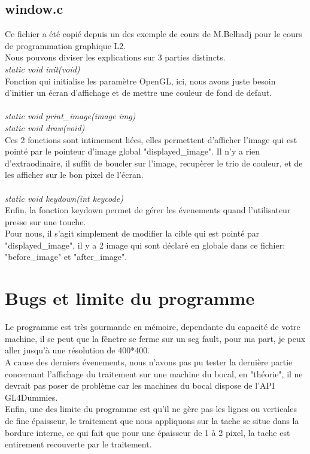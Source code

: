 \documentclass[12pt, letterpaper]{article}
\begin{document}
\subsection{window.c}
Ce fichier a été copié depuis un des exemple de cours de M.Belhadj pour le cours de programmation graphique L2.\\
Nous pouvons diviser les explications sur 3 parties distincts. \\
\textit{static void init(void)}\\
Fonction qui initialise les paramètre OpenGL, ici, nous avons juste besoin d'initier un écran d'affichage 
et de mettre une couleur de fond de defaut.\\\\
\textit{static void print\_image(image img)}\\
\textit{static void draw(void)}\\
Ces 2 fonctions sont intimement liées, elles permettent d'afficher l'image qui est pointé par le pointeur d'image global 
"displayed\_image". Il n'y a rien d'extraodinaire, il suffit de boucler sur l'image, recupèrer le trio de couleur, et de les afficher sur le bon pixel de l'écran.\\ 
\\
\textit{static void keydown(int keycode)}\\
Enfin, la fonction keydown permet de gérer les évenements quand l'utilisateur presse sur une touche.\\
Pour nous, il s'agit simplement de modifier la cible qui est pointé par "displayed\_image", il y a 2 image qui sont déclaré en globale 
dans ce fichier: "before\_image" et "after\_image".\\

\section{Bugs et limite du programme}
Le programme est très gourmande en mémoire, dependante du capacité de votre machine, il se peut 
que la fênetre se ferme sur un seg fault, pour ma part, je peux aller jusqu'à une résolution de 400*400.\\
A cause des derniers évenements, nous n'avons pas pu tester la dernière partie concernant l'affichage du traitement 
sur une machine du bocal, en "théorie", il ne devrait pas poser de problème car les machines du bocal dispose de l'API GL4Dummies.\\
Enfin, une des limite du programme est qu'il ne gère pas les lignes ou verticales de fine épaisseur, 
le traitement que nous appliquons sur la tache se situe dans la bordure interne, ce qui fait que pour une épaisseur de 1 à 2 pixel, 
la tache est entirement recouverte par le traitement. 
\end{document}
